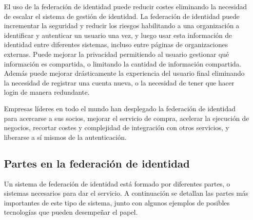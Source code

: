     El uso de la federación de identidad puede reducir costes
    eliminando la necesidad de escalar el sistema de gestión de
    identidad. La federación de identidad puede incrementar la
    seguridad y reducir los riesgos habilitando a una organización a
    identificar y autenticar un usuario una vez, y luego usar esta
    información de identidad entre diferentes sistemas, incluso entre
    páginas de organizaciones externas. Puede mejorar la privacidad
    permitiendo al usuario gestionar qué información es compartida, o
    limitando la cantidad de información compartida. Además puede
    mejorar drásticamente la experiencia del usuario final eliminando
    la necesidad de registrar una cuenta nueva, o la necesidad de
    tener que hacer login de manera redundante.

    Empresas líderes en todo el mundo han desplegado la federación de
    identidad para acercarse a sus socios, mejorar el servicio de
    compra, acelerar la ejecución de negocios, recortar costes y
    complejidad de integración con otros servicios, y liberarse a sí
    mismos de la autenticación.

        \subsection{Partes en la federación de identidad}

    Un sistema de federación de identidad está formado por diferentes
    partes, o sistemas necesarios para dar el servicio. A continuación
    se detallan las partes más importantes de este tipo de sistema,
    junto con algunos ejemplos de posibles tecnologías que pueden
    desempeñar el papel.

